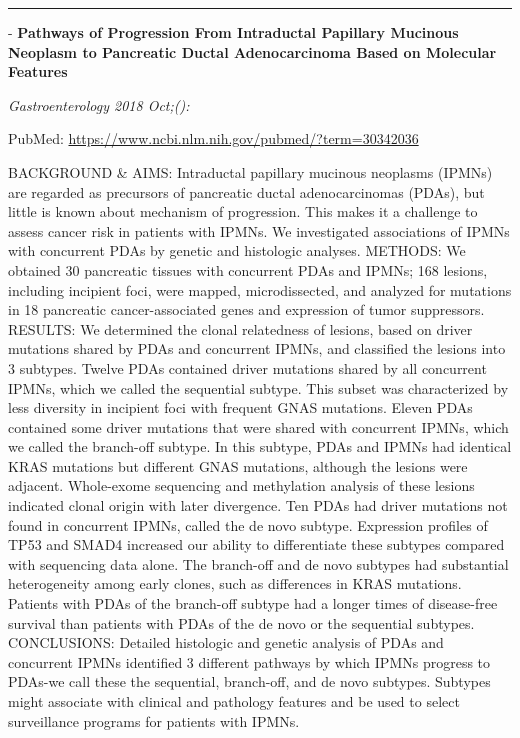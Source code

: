 \documentclass[]{article}
\begin{document}
{}

{}

\begin{center}\rule{0.5\linewidth}{\linethickness}\end{center}

 - \textbf{Pathways of Progression From Intraductal Papillary Mucinous
Neoplasm to Pancreatic Ductal Adenocarcinoma Based on Molecular
Features}

\emph{Gastroenterology 2018 Oct;():}

PubMed: \url{https://www.ncbi.nlm.nih.gov/pubmed/?term=30342036}

BACKGROUND \& AIMS: Intraductal papillary mucinous neoplasms (IPMNs) are
regarded as precursors of pancreatic ductal adenocarcinomas (PDAs), but
little is known about mechanism of progression. This makes it a
challenge to assess cancer risk in patients with IPMNs. We investigated
associations of IPMNs with concurrent PDAs by genetic and histologic
analyses. METHODS: We obtained 30 pancreatic tissues with concurrent
PDAs and IPMNs; 168 lesions, including incipient foci, were mapped,
microdissected, and analyzed for mutations in 18 pancreatic
cancer-associated genes and expression of tumor suppressors. RESULTS: We
determined the clonal relatedness of lesions, based on driver mutations
shared by PDAs and concurrent IPMNs, and classified the lesions into 3
subtypes. Twelve PDAs contained driver mutations shared by all
concurrent IPMNs, which we called the sequential subtype. This subset
was characterized by less diversity in incipient foci with frequent GNAS
mutations. Eleven PDAs contained some driver mutations that were shared
with concurrent IPMNs, which we called the branch-off subtype. In this
subtype, PDAs and IPMNs had identical KRAS mutations but different GNAS
mutations, although the lesions were adjacent. Whole-exome sequencing
and methylation analysis of these lesions indicated clonal origin with
later divergence. Ten PDAs had driver mutations not found in concurrent
IPMNs, called the de novo subtype. Expression profiles of TP53 and SMAD4
increased our ability to differentiate these subtypes compared with
sequencing data alone. The branch-off and de novo subtypes had
substantial heterogeneity among early clones, such as differences in
KRAS mutations. Patients with PDAs of the branch-off subtype had a
longer times of disease-free survival than patients with PDAs of the de
novo or the sequential subtypes. CONCLUSIONS: Detailed histologic and
genetic analysis of PDAs and concurrent IPMNs identified 3 different
pathways by which IPMNs progress to PDAs-we call these the sequential,
branch-off, and de novo subtypes. Subtypes might associate with clinical
and pathology features and be used to select surveillance programs for
patients with IPMNs.
\end{document}
